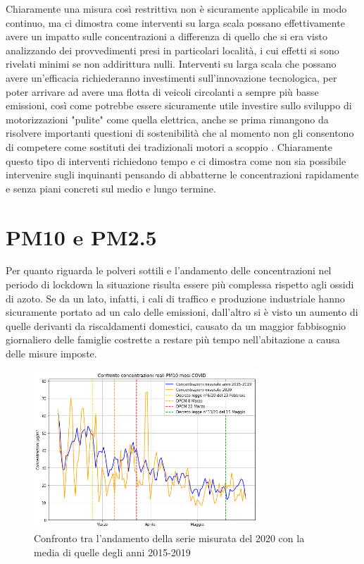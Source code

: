 \documentclass[a4paper,12pt]{report}
\begin{document}
Chiaramente una misura così restrittiva non è sicuramente applicabile in modo continuo, ma ci dimostra come interventi su larga scala possano effettivamente avere un
 impatto sulle concentrazioni a differenza di quello che si era visto analizzando dei provvedimenti presi in particolari località, i cui effetti si sono rivelati minimi se non addirittura nulli.
Interventi su larga scala che possano avere un'efficacia richiederanno investimenti sull'innovazione tecnologica, per poter arrivare ad avere una flotta di veicoli circolanti a sempre più basse emissioni, così come potrebbe essere sicuramente utile investire sullo sviluppo di motorizzazioni "pulite" come quella elettrica, anche se prima rimangono da risolvere importanti questioni di sostenibilità che al momento non gli consentono di competere come sostituti dei tradizionali motori a scoppio \cite{skonhoft2014norwegian, jones2019if}.
Chiaramente questo tipo di interventi richiedono tempo
 e ci dimostra come non sia possibile intervenire sugli inquinanti pensando di abbatterne le concentrazioni rapidamente e senza piani concreti sul medio e lungo termine.

\section{PM10 e PM2.5}
Per quanto riguarda le polveri sottili e l'andamento delle concentrazioni nel periodo di lockdown la situazione risulta essere più complessa rispetto agli ossidi di azoto.
Se da un lato, infatti, i cali di traffico e produzione industriale hanno sicuramente portato ad un calo delle emissioni, dall'altro si è visto un aumento di quelle derivanti da riscaldamenti domestici, causato da un maggior fabbisognio giornaliero delle famiglie costrette a restare più tempo nell'abitazione a causa delle misure imposte. 

\begin{figure}[h]
\centering
\includegraphics[width=0.75\textwidth]{pm10_covid}
\caption{Confronto tra l'andamento della serie misurata del 2020 con la media di quelle degli anni 2015-2019}
\label{fig:pm10_covid}
\end{figure}
\end{document}
